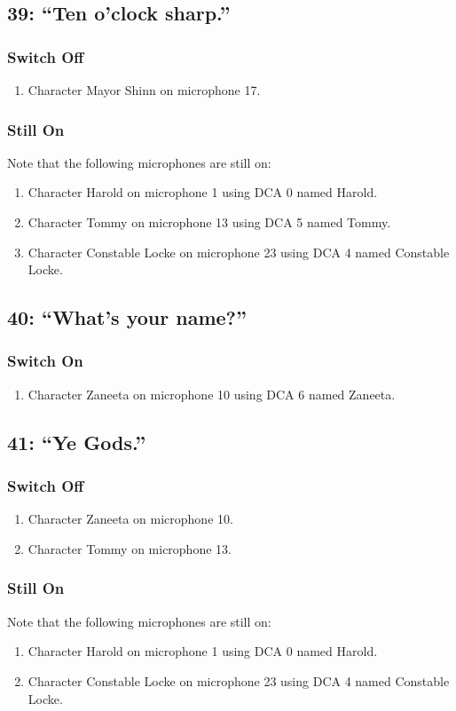 \subsection* {39: ``Ten o'clock sharp.''}
\subsubsection* {Switch Off}
\begin{enumerate}
\item Character Mayor Shinn on microphone 17.
\end{enumerate}
\subsubsection* {Still On}
Note that the following microphones are still on:
\begin{enumerate}
\item Character Harold on microphone 1 using DCA 0 named Harold.
\item Character Tommy on microphone 13 using DCA 5 named Tommy.
\item Character Constable Locke on microphone 23 using DCA 4 named Constable Locke.
\end{enumerate}
\subsection* {40: ``What's your name?''}
\subsubsection* {Switch On}
\begin{enumerate}
\item Character Zaneeta on microphone 10 using DCA 6 named Zaneeta.
\end{enumerate}
\subsection* {41: ``Ye Gods.''}
\subsubsection* {Switch Off}
\begin{enumerate}
\item Character Zaneeta on microphone 10.
\item Character Tommy on microphone 13.
\end{enumerate}
\subsubsection* {Still On}
Note that the following microphones are still on:
\begin{enumerate}
\item Character Harold on microphone 1 using DCA 0 named Harold.
\item Character Constable Locke on microphone 23 using DCA 4 named Constable Locke.
\end{enumerate}
